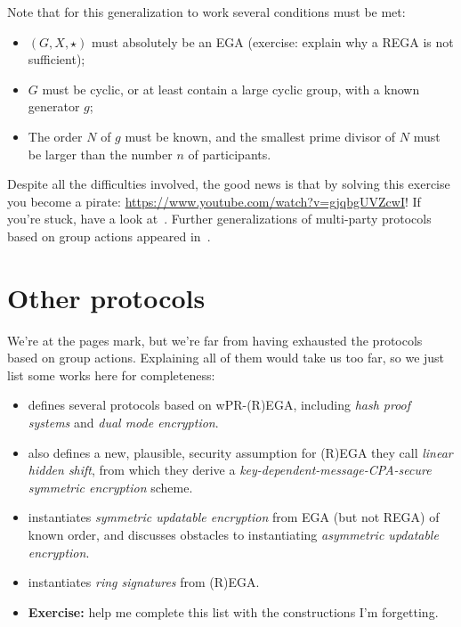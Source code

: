 \documentclass{article}
\begin{document}
Note that for this generalization to work several conditions must be met:
\begin{itemize}
\item $(G,X,\star)$ must absolutely be an EGA (exercise: explain why a
  REGA is not sufficient);
\item $G$ must be cyclic, or at least contain a large cyclic group,
  with a known generator $g$;
\item The order $N$ of $g$ must be known, and the smallest prime
  divisor of $N$ must be larger than the number $n$ of participants.
\end{itemize}

Despite all the difficulties involved, the good news is that by
solving this exercise you become a pirate:
\url{https://www.youtube.com/watch?v=gjqbgUVZcwI}!  If you're stuck,
have a look at~\cite{PKC:DeFMey20}.  Further generalizations of
multi-party protocols based on group actions appeared
in~\cite{PQCRYPTO:CozSma20,EPRINT:BDPV20}.


\section{Other protocols}
\label{sec:other-protocols}

We're at the \pageref*{sec:other-protocols} pages mark, but we're far
from having exhausted the protocols based on group actions.
Explaining all of them would take us too far, so we just list some
works here for completeness:
\begin{itemize}
\item \cite{AC:ADMP20} defines several protocols based on wPR-(R)EGA,
  including \emph{hash proof systems} and \emph{dual mode encryption}.
\item \cite{AC:ADMP20} also defines a new, plausible, security
  assumption for (R)EGA they call \emph{linear hidden shift}, from
  which they derive a \emph{key-dependent-message-CPA-secure symmetric
    encryption} scheme.
\item \cite{cryptoeprint:2020:1593} instantiates \emph{symmetric
    updatable encryption} from EGA (but not REGA) of known order, and
  discusses obstacles to instantiating \emph{asymmetric updatable
    encryption}.
\item \cite{AC:BeuKatPin20} instantiates \emph{ring signatures} from
  (R)EGA.
\item \textbf{Exercise:} help me complete this list with the
  constructions I'm forgetting.
\end{itemize}
\end{document}

